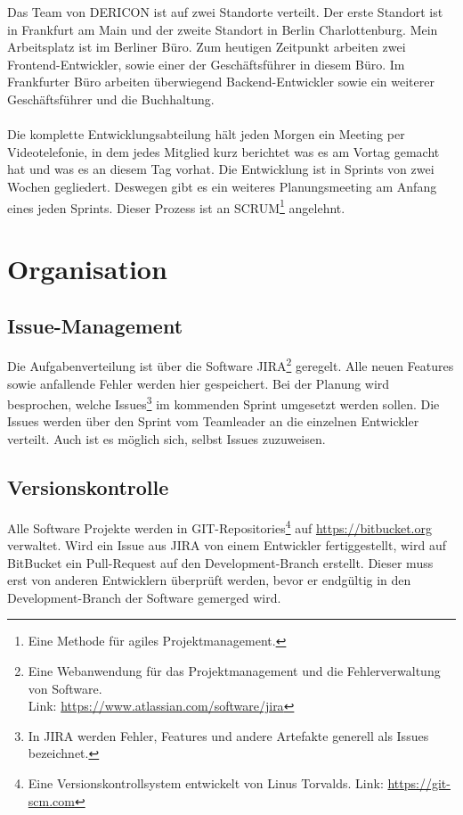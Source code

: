\documentclass[chapterprefix=false, 12pt, a4paper, oneside, parskip=half, listof=totoc, bibliography=totoc, numbers=noendperiod]{scrbook}
\begin{document}
    Das Team von DERICON ist auf zwei Standorte verteilt. Der erste Standort ist in Frankfurt am Main und der zweite Standort in Berlin Charlottenburg.
    Mein Arbeitsplatz ist im Berliner Büro. Zum heutigen Zeitpunkt arbeiten zwei Frontend-Entwickler, sowie einer der Geschäftsführer in diesem Büro.
    Im Frankfurter Büro arbeiten überwiegend Backend-Entwickler sowie ein weiterer Geschäftsführer und die Buchhaltung.
    \\ \\
    Die komplette Entwicklungsabteilung hält jeden Morgen ein Meeting per Videotelefonie, in dem jedes Mitglied kurz berichtet
    was es am Vortag gemacht hat und was es an diesem Tag vorhat.
    Die Entwicklung ist in Sprints von zwei Wochen gegliedert. Deswegen gibt es ein weiteres Planungsmeeting am Anfang eines jeden Sprints.
    Dieser Prozess ist an SCRUM\footnote{Eine Methode für agiles Projektmanagement.} angelehnt.

    \section{Organisation}

    \subsection{Issue-Management}

    Die Aufgabenverteilung ist über die Software JIRA\footnote{Eine Webanwendung für das Projektmanagement und die Fehlerverwaltung von Software. \\ Link: \url{https://www.atlassian.com/software/jira}} geregelt.
    Alle neuen Features sowie anfallende Fehler werden hier gespeichert.
    Bei der Planung wird besprochen, welche Issues\footnote{In JIRA werden Fehler, Features und andere Artefakte generell als Issues bezeichnet.}
    im kommenden Sprint umgesetzt werden sollen. Die Issues werden über den Sprint vom Teamleader an die einzelnen Entwickler verteilt. Auch ist es möglich sich, selbst Issues zuzuweisen.

    \pagebreak

    \subsection{Versionskontrolle}

    Alle Software Projekte werden in GIT-Repositories\footnote{Eine Versionskontrollsystem entwickelt von Linus Torvalds. Link: \url{https://git-scm.com}}
    auf \url{https://bitbucket.org} \\ verwaltet.
    Wird ein Issue aus JIRA von einem Entwickler fertiggestellt, wird auf BitBucket ein Pull-Request auf den Development-Branch erstellt.
    Dieser muss erst von anderen Entwicklern überprüft werden, bevor er endgültig in den Development-Branch der Software
    gemerged wird.
\end{document}

